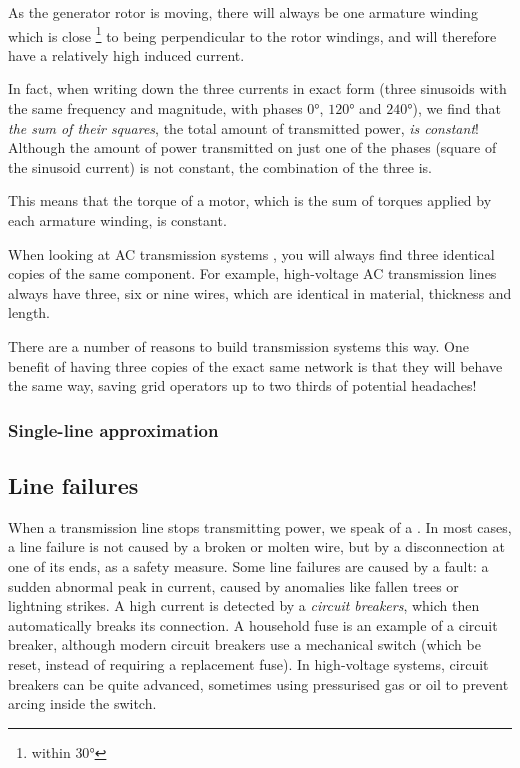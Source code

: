 \documentclass[main.tex]{subfiles}
\begin{document}
As the generator rotor is moving, there will always be one armature winding which is close \footnote{within $30 \si{\degree}$} to being perpendicular to the rotor windings, and will therefore have a relatively high induced current. 

In fact, when writing down the three currents in exact form (three sinusoids with the same frequency and magnitude, with phases $0\si{\degree}$, $120\si{\degree}$ and $240\si{\degree}$), we find that \emph{the sum of their squares}, \ie the total amount of transmitted power, \emph{is constant}! Although the amount of power transmitted on just one of the phases (square of the sinusoid current) is not constant, the combination of the three is. 

This means that the torque of a motor, which is the sum of torques applied by each armature winding, is constant.




When looking at AC transmission systems , you will always find three identical copies of the same component. For example, high-voltage AC transmission lines always have three, six or nine wires, which are identical in material, thickness and length. 

There are a number of reasons to build transmission systems this way. One benefit of having three copies of the exact same network is that they will behave the same way, saving grid operators up to two thirds of potential headaches!

\subsubsection{Single-line approximation}


\subsection{Line failures}
When a transmission line stops transmitting power, we speak of a . In most cases, a line failure is not caused by a broken or molten wire, but by a disconnection at one of its ends, as a safety measure. 
Some line failures are caused by a fault: a sudden abnormal peak in current, caused by anomalies like fallen trees or lightning strikes. A high current is detected by a \emph{circuit breakers}, which then automatically breaks its connection. A household fuse is an example of a circuit breaker, although modern circuit breakers use a mechanical switch (which be reset, instead of requiring a replacement fuse). In high-voltage systems, circuit breakers can be quite advanced, sometimes using pressurised gas or oil to prevent arcing inside the switch.
\end{document}
